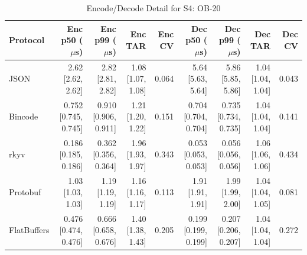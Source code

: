 \begin{table}[htbp]
\centering
\caption{Encode/Decode Detail for S4: OB-20}
\label{tab:detail_book_medium}
\begin{tabular}{l r r r r r r r r}
\hline
Protocol & Enc p50 ($\mu$s) & Enc p99 ($\mu$s) & Enc TAR & Enc CV & Dec p50 ($\mu$s) & Dec p99 ($\mu$s) & Dec TAR & Dec CV \\
\hline
  JSON & 2.62 [2.62, 2.62] & 2.82 [2.81, 2.82] & 1.08 [1.07, 1.08] & 0.064 & 5.64 [5.63, 5.64] & 5.86 [5.85, 5.86] & 1.04 [1.04, 1.04] & 0.043 \\
  Bincode & 0.752 [0.745, 0.745] & 0.910 [0.906, 0.911] & 1.21 [1.20, 1.22] & 0.151 & 0.704 [0.704, 0.704] & 0.735 [0.734, 0.735] & 1.04 [1.04, 1.04] & 0.141 \\
  rkyv & 0.186 [0.185, 0.186] & 0.362 [0.356, 0.364] & 1.96 [1.93, 1.97] & 0.343 & 0.053 [0.053, 0.053] & 0.056 [0.056, 0.056] & 1.06 [1.06, 1.06] & 0.434 \\
  Protobuf & 1.03 [1.03, 1.03] & 1.19 [1.19, 1.19] & 1.16 [1.16, 1.17] & 0.113 & 1.91 [1.91, 1.91] & 1.99 [1.99, 2.00] & 1.04 [1.04, 1.05] & 0.081 \\
  FlatBuffers & 0.476 [0.474, 0.476] & 0.666 [0.658, 0.676] & 1.40 [1.38, 1.43] & 0.205 & 0.199 [0.199, 0.199] & 0.207 [0.206, 0.207] & 1.04 [1.04, 1.04] & 0.272 \\
\hline
\end{tabular}
\end{table}
